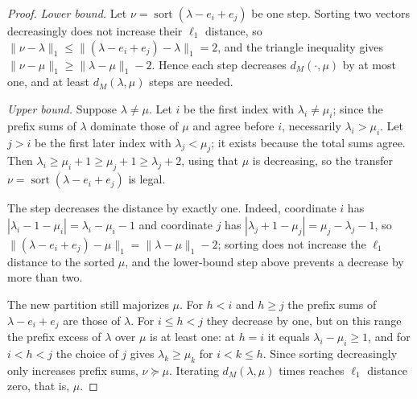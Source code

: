 \documentclass[pdflatex,sn-mathphys-num]{sn-jnl}
\theoremstyle{thmstyleone}
\theoremstyle{thmstylethree}
\theoremstyle{thmstyletwo}
\begin{document}
\begin{proof}
\emph{Lower bound.}  Let $\nu=\operatorname{sort}(\lambda-e_i+e_j)$ be one
step.  Sorting two vectors decreasingly does not increase their $\ell_1$
distance, so
$\|\nu-\lambda\|_1\le\|(\lambda-e_i+e_j)-\lambda\|_1=2$, and the triangle
inequality gives $\|\nu-\mu\|_1\ge\|\lambda-\mu\|_1-2$.  Hence each step
decreases $d_M(\cdot,\mu)$ by at most one, and at least
$d_M(\lambda,\mu)$ steps are needed.

\emph{Upper bound.}  Suppose $\lambda\ne\mu$.  Let $i$ be the first index
with $\lambda_i\ne\mu_i$; since the prefix sums of $\lambda$ dominate those
of $\mu$ and agree before $i$, necessarily $\lambda_i>\mu_i$.  Let $j>i$ be
the first later index with $\lambda_j<\mu_j$; it exists because the total
sums agree.  Then $\lambda_i\ge\mu_i+1\ge\mu_j+1\ge\lambda_j+2$, using that
$\mu$ is decreasing, so the transfer
$\nu=\operatorname{sort}(\lambda-e_i+e_j)$ is legal.

The step decreases the distance by exactly one.  Indeed, coordinate $i$ has
$|\lambda_i-1-\mu_i|=\lambda_i-\mu_i-1$ and coordinate $j$ has
$|\lambda_j+1-\mu_j|=\mu_j-\lambda_j-1$, so
$\|(\lambda-e_i+e_j)-\mu\|_1=\|\lambda-\mu\|_1-2$; sorting does not increase
the $\ell_1$ distance to the sorted $\mu$, and the lower-bound step above
prevents a decrease by more than two.

The new partition still majorizes $\mu$.  For $h<i$ and $h\ge j$ the prefix
sums of $\lambda-e_i+e_j$ are those of $\lambda$.  For $i\le h<j$ they
decrease by one, but on this range the prefix excess of $\lambda$ over $\mu$
is at least one: at $h=i$ it equals $\lambda_i-\mu_i\ge1$, and for
$i<h<j$ the choice of $j$ gives $\lambda_k\ge\mu_k$ for $i<k\le h$.  Since
sorting decreasingly only increases prefix sums, $\nu\succeq\mu$.  Iterating
$d_M(\lambda,\mu)$ times reaches $\ell_1$ distance zero, that is, $\mu$.
\end{proof}
\end{document}
